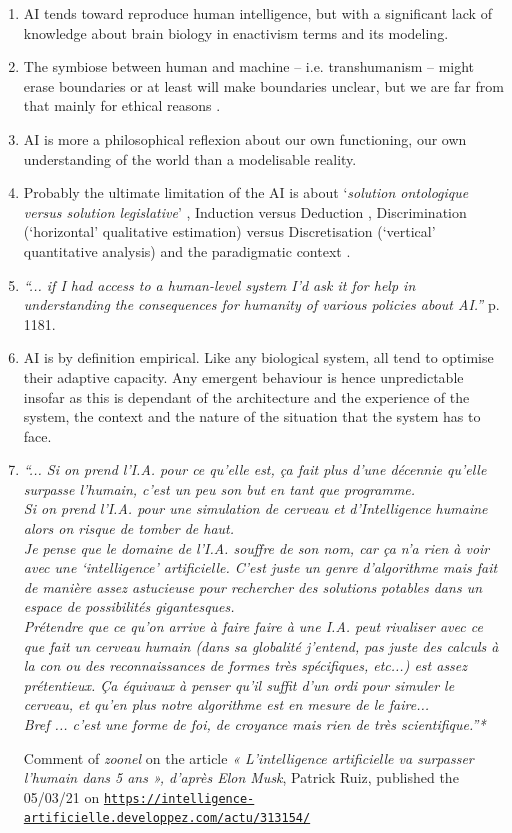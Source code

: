 \documentclass{article}
\begin{document}
\begin{enumerate}[leftmargin=*,label=\underline{\textit{Statement} \arabic*} :]
\item AI tends toward reproduce human intelligence, but with a significant lack of knowledge about brain biology in enactivism terms and its modeling.
\item The symbiose between human and machine -- i.e. transhumanism --  might erase boundaries or at least will make boundaries unclear, but we are far from that mainly for ethical reasons \citep{hgw}.  
\item AI is more a philosophical reflexion about our own functioning, our own understanding of the world than a modelisable reality.
\item Probably the ultimate limitation of the AI is about `\textit{solution ontologique versus solution legislative}' \citep{cse}, Induction versus Deduction \citep{fxd}, Discrimination (`horizontal' qualitative estimation) versus  Discretisation (`vertical' quantitative analysis) and the paradigmatic context \citep{herz}.
\item \textsl{``... if I had access to a human-level system I’d ask it for help in understanding the consequences for humanity of various policies about AI.''} \citep{jmc} p. 1181.
\item AI is by definition empirical. Like any biological system, all tend to optimise their adaptive capacity. Any emergent behaviour is hence unpredictable insofar as this is dependant of the architecture and the experience of the system, the context and the nature of the situation that the system has to face.
\item \textit{``... Si on prend l'I.A. pour ce qu'elle est, ça fait plus d'une décennie qu'elle surpasse l'humain, c'est un peu son but en tant que programme.\\
Si on prend l'I.A. pour une simulation de cerveau et d'Intelligence humaine alors on risque de tomber de haut.\\
Je pense que le domaine de l'I.A. souffre de son nom, car ça n'a rien à voir avec une `intelligence' artificielle. C'est juste un genre d'algorithme mais fait de manière assez astucieuse pour rechercher des solutions potables dans un espace de possibilités gigantesques.\\
Prétendre que ce qu'on arrive à faire faire à une I.A. peut rivaliser avec ce que fait un cerveau humain (dans sa globalité j'entend, pas juste des calculs à la con ou des reconnaissances de formes très spécifiques, etc...) est assez prétentieux. Ça équivaux à penser qu'il suffit d'un ordi pour simuler le cerveau, et qu'en plus notre algorithme est en mesure de le faire...\\ Bref ... c'est une forme de foi, de croyance mais rien de très scientifique.''*}
\begin{spacing}{0.8}
{\footnotesize * Comment of \textsl{zoonel} on the article \textit{« L'intelligence artificielle va surpasser l'humain dans 5 ans », d'après Elon Musk}, Patrick Ruiz, published the 05/03/21 on \href{https://intelligence-artificielle.developpez.com/actu/313154/}{\texttt{\scriptsize https://intelligence-artificielle.developpez.com/actu/313154/}}
}%
\end{spacing}
\end{enumerate}
\end{document}
